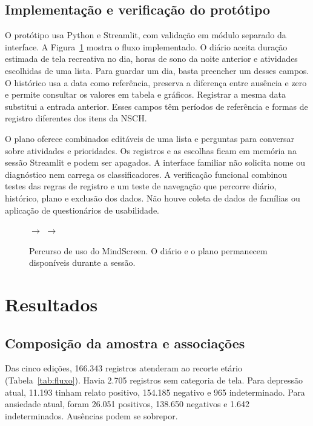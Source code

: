 ﻿\documentclass[12pt]{article}
\begin{document}
\subsection{Implementação e verificação do protótipo}
O protótipo usa Python e Streamlit, com validação em módulo separado da interface. A Figura~\ref{fig:fluxo-produto} mostra o fluxo implementado. O diário aceita duração estimada de tela recreativa no dia, horas de sono da noite anterior e atividades escolhidas de uma lista. Para guardar um dia, basta preencher um desses campos. O histórico usa a data como referência, preserva a diferença entre ausência e zero e permite consultar os valores em tabela e gráficos. Registrar a mesma data substitui a entrada anterior. Esses campos têm períodos de referência e formas de registro diferentes dos itens da NSCH.

O plano oferece combinados editáveis de uma lista e perguntas para conversar sobre atividades e prioridades. Os registros e as escolhas ficam em memória na sessão Streamlit e podem ser apagados. A interface familiar não solicita nome ou diagnóstico nem carrega os classificadores. A verificação funcional combinou testes das regras de registro e um teste de navegação que percorre diário, histórico, plano e exclusão dos dados. Não houve coleta de dados de famílias ou aplicação de questionários de usabilidade.

\begin{figure}[htbp]
\centering
{}
\quad$\longrightarrow$\quad
{}
\quad$\longrightarrow$\quad
{}
\caption{Percurso de uso do MindScreen. O diário e o plano permanecem disponíveis durante a sessão.}
\label{fig:fluxo-produto}
\end{figure}

\section{Resultados}
\subsection{Composição da amostra e associações}
Das cinco edições, 166.343 registros atenderam ao recorte etário (Tabela~\ref{tab:fluxo}). Havia 2.705 registros sem categoria de tela. Para depressão atual, 11.193 tinham relato positivo, 154.185 negativo e 965 indeterminado. Para ansiedade atual, foram 26.051 positivos, 138.650 negativos e 1.642 indeterminados. Ausências podem se sobrepor.
\end{document}
